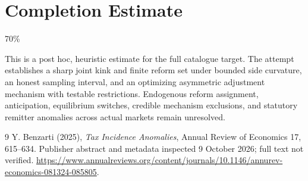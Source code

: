 \documentclass[11pt]{article}
\theoremstyle{remark}
\begin{document}
\section{Completion Estimate}
70\%

This is a post hoc, heuristic estimate for the full catalogue target.
The attempt establishes a sharp joint kink and finite reform set under bounded side curvature, an honest sampling interval, and an optimizing asymmetric adjustment mechanism with testable restrictions. Endogenous reform assignment, anticipation, equilibrium switches, credible mechanism exclusions, and statutory remitter anomalies across actual markets remain unresolved.

\begin{thebibliography}{9}
 Y. Benzarti (2025), \emph{Tax Incidence Anomalies}, Annual Review of Economics 17, 615--634. Publisher abstract and metadata inspected 9 October 2026; full text not verified. \url{https://www.annualreviews.org/content/journals/10.1146/annurev-economics-081324-085805}.
\end{thebibliography}
\end{document}
